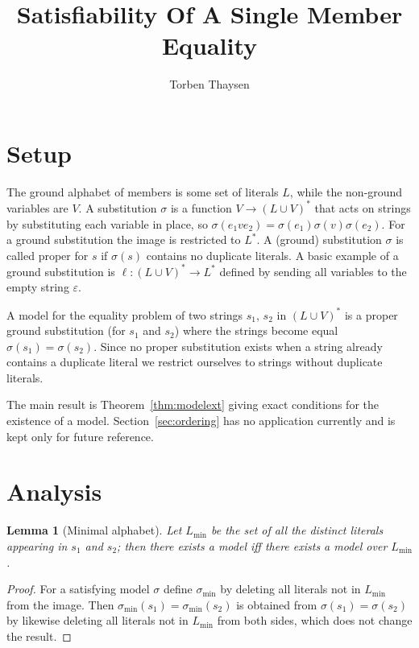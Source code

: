 \documentclass[a4paper, 12pt]{article}
\author{Torben Thaysen}
\title{Satisfiability Of A Single Member Equality}
\newtheorem{lemma}{Lemma}[section]
\begin{document}
\maketitle

\section{Setup}
The ground alphabet of members is some set of literals $L$, while the non-ground variables are $V$.
A substitution $\sigma$ is a function $V \to (L \cup V)^*$ that acts on strings by substituting each variable in place, so $\sigma(e_1 v e_2) = \sigma(e_1) \sigma(v) \sigma(e_2)$. For a ground substitution the image is restricted to $L^*$. A (ground) substitution $\sigma$ is called proper for $s$ if $\sigma(s)$ contains no duplicate literals. A basic example of a ground substitution is $\ell: (L \cup V)^* \to L^*$ defined by sending all variables to the empty string $\varepsilon$.

A model for the equality problem of two strings $s_1$, $s_2$ in $(L \cup V)^*$ is a proper ground substitution (for $s_1$ and $s_2$) where the strings become equal $\sigma(s_1) = \sigma(s_2)$. Since no proper substitution exists when a string already contains a duplicate literal we restrict ourselves to strings without duplicate literals.

The main result is Theorem~\ref{thm:modelext} giving exact conditions for the existence of a model. Section~\ref{sec:ordering} has no application currently and is kept only for future reference.
\section{Analysis}

\newcommand{\Lmin}{L_\text{min}}
\begin{lemma}[Minimal alphabet]\label{lem:minalp}
Let $\Lmin$ be the set of all the distinct literals appearing in $s_1$ and $s_2$; then there exists a model iff there exists a model over $\Lmin$.
\end{lemma}
\begin{proof}
For a satisfying model $\sigma$ define $\sigma_\text{min}$ by deleting all literals not in $\Lmin$ from the image. Then $\sigma_\text{min}(s_1) = \sigma_\text{min}(s_2)$ is obtained from $\sigma(s_1) = \sigma(s_2)$ by likewise deleting all literals not in $\Lmin$ from both sides, which does not change the result.
\end{proof}
\end{document}
